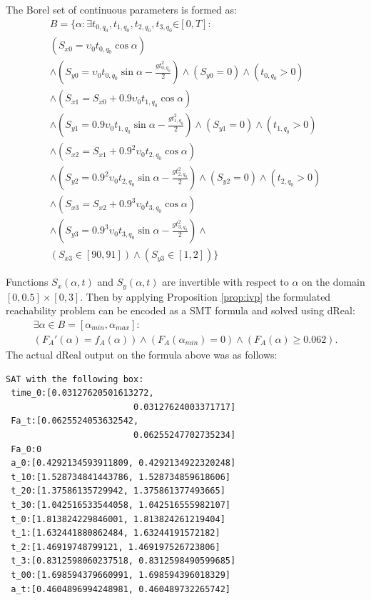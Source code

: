 The Borel set of continuous parameters is formed as:
\begin{equation*}
\begin{split}
B =\{\alpha: \exists t_{0, q_0}, t_{1, q_0}, t_{2, q_0}, t_{3, q_0} \mathord{\in} [0, T]:\\
(S_{x0} = \upsilon_0 t_{0, q_0} \cos{\alpha}) \\
\wedge (S_{y0} = \upsilon_0 t_{0, q_0} \sin{\alpha} - \frac{gt_{0, q_0}^2}{2}) \wedge 
(S_{y0} = 0) \wedge (t_{0, q_0} > 0) \\
\wedge (S_{x1} = S_{x0} + 0.9 \upsilon_0 t_{1, q_0} \cos{\alpha}) \\
\wedge (S_{y1} = 0.9 \upsilon_0 t_{1, q_0} \sin{\alpha} - \frac{gt_{1, q_0}^2}{2}) \wedge 
(S_{y1} = 0) \wedge (t_{1, q_0} > 0) \\
\wedge (S_{x2} = S_{x1} + 0.9^2 \upsilon_0 t_{2, q_0} \cos{\alpha}) \\
\wedge (S_{y2} = 0.9^2 \upsilon_0 t_{2, q_0} \sin{\alpha} - \frac{gt_{2, q_0}^2}{2})
\wedge (S_{y2} = 0) \wedge (t_{2, q_0} > 0) \\
\wedge (S_{x3} = S_{x2} + 0.9^3 \upsilon_0 t_{3, q_0} \cos{\alpha}) \\
\wedge (S_{y3} = 0.9^3 \upsilon_0 t_{3, q_0} \sin{\alpha} - \frac{gt_{3, q_0}^2}{2}) \wedge \\
(S_{x3} \in [90, 91]) \wedge (S_{y3} \in [1, 2])\}
\end{split}
\end{equation*}

Functions $S_x(\alpha, t)$ and $S_y(\alpha, t)$ are invertible with respect to $\alpha$ on 
the domain $[0, 0.5]\times[0, 3]$. Then by applying Proposition \ref{prop:ivp} the formulated 
reachability problem can be encoded as a SMT formula and solved using dReal:
\begin{multline*} 
\exists \alpha \in B = [\alpha_{min}, \alpha_{max}]:\\
(F_A'(\alpha) = f_A(\alpha)) \wedge (F_A(\alpha_{min}) = 0) \wedge (F_A(\alpha) \ge 0.062) .
\end{multline*}
The actual dReal output on the formula above was as follows:
\begin{verbatim}
SAT with the following box:
 time_0:[0.03127620501613272,
                         0.03127624003371717]
 Fa_t:[0.0625524053632542,
                         0.06255247702735234]
 Fa_0:0
 a_0:[0.4292134593911809, 0.4292134922320248]
 t_10:[1.528734841443786, 1.528734859618606]
 t_20:[1.37586135729942, 1.375861377493665]
 t_30:[1.042516533544058, 1.042516555982107]
 t_0:[1.813824229846001, 1.813824261219404]
 t_1:[1.632441880862484, 1.63244191572182]
 t_2:[1.46919748799121, 1.469197526723806]
 t_3:[0.8312598060237518, 0.8312598490599685]
 t_00:[1.698594379660991, 1.698594396018329]
 a_t:[0.4604896994248981, 0.460489732265742]
\end{verbatim}

